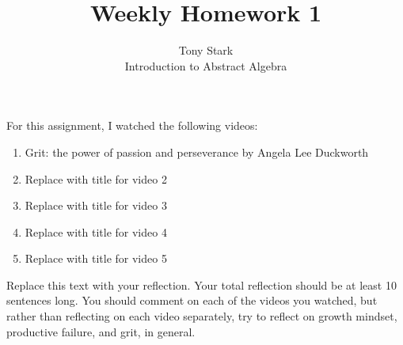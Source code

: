 \documentclass[12pt]{article}
\begin{document}
 
 
\title{Weekly Homework 1}
\author{Tony Stark\\ %
Introduction to Abstract Algebra}

\maketitle

\noindent For this assignment, I watched the following videos:

\begin{enumerate} %
\item Grit: the power of passion and perseverance by Angela Lee Duckworth  
\item Replace with title for video 2
\item Replace with title for video 3
\item Replace with title for video 4
\item Replace with title for video 5
\end{enumerate}

Replace this text with your reflection.  Your total reflection should be at least 10 sentences long. You should comment on each of the videos you watched, but rather than reflecting on each video separately, try to reflect on growth mindset, productive failure, and grit, in general.
 
 
\end{document}
